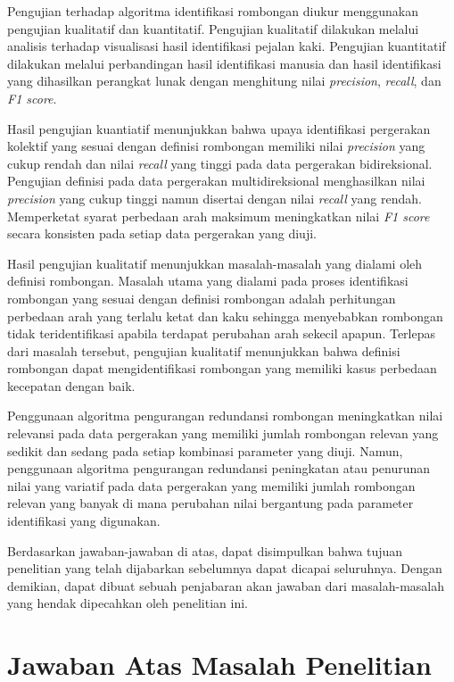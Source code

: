 \begin{enumerate}
    Pengujian terhadap algoritma identifikasi rombongan diukur menggunakan pengujian kualitatif dan kuantitatif. Pengujian kualitatif dilakukan melalui analisis terhadap visualisasi hasil identifikasi pejalan kaki. Pengujian kuantitatif dilakukan melalui perbandingan hasil identifikasi manusia dan hasil identifikasi yang dihasilkan perangkat lunak dengan menghitung nilai \textit{precision}, \textit{recall}, dan \textit{F1 score}.
    
    Hasil pengujian kuantiatif menunjukkan bahwa upaya identifikasi pergerakan kolektif yang sesuai dengan definisi rombongan memiliki nilai \textit{precision} yang cukup rendah dan nilai \textit{recall} yang tinggi pada data pergerakan bidireksional. Pengujian definisi pada data pergerakan multidireksional menghasilkan nilai \textit{precision} yang cukup tinggi namun disertai dengan nilai \textit{recall} yang rendah. Memperketat syarat perbedaan arah maksimum meningkatkan nilai \textit{F1 score} secara konsisten pada setiap data pergerakan yang diuji.
    
    Hasil pengujian kualitatif menunjukkan masalah-masalah yang dialami oleh definisi rombongan. Masalah utama yang dialami pada proses identifikasi rombongan yang sesuai dengan definisi rombongan adalah perhitungan perbedaan arah yang terlalu ketat dan kaku sehingga menyebabkan rombongan tidak teridentifikasi apabila terdapat perubahan arah sekecil apapun. Terlepas dari masalah tersebut, pengujian kualitatif menunjukkan bahwa definisi rombongan dapat mengidentifikasi rombongan yang memiliki kasus perbedaan kecepatan dengan baik.
    
    Penggunaan algoritma pengurangan redundansi rombongan meningkatkan nilai relevansi pada data pergerakan yang memiliki jumlah rombongan relevan yang sedikit dan sedang pada setiap kombinasi parameter yang diuji. Namun, penggunaan algoritma pengurangan redundansi peningkatan atau penurunan nilai yang variatif pada data pergerakan yang memiliki jumlah rombongan relevan yang banyak di mana perubahan nilai bergantung pada parameter identifikasi yang digunakan.
\end{enumerate}

Berdasarkan jawaban-jawaban di atas, dapat disimpulkan bahwa tujuan penelitian yang telah dijabarkan sebelumnya dapat dicapai seluruhnya. Dengan demikian, dapat dibuat sebuah penjabaran akan jawaban dari masalah-masalah yang hendak dipecahkan oleh penelitian ini.

\section{Jawaban Atas Masalah Penelitian}
\label{sec:jawaban-masalah}

